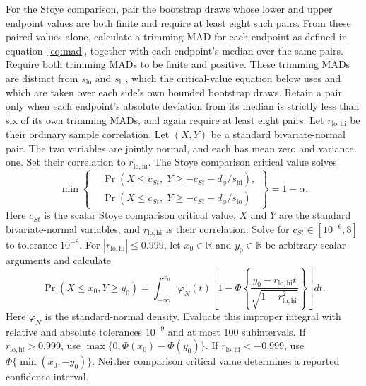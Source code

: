 \documentclass[11pt]{article}
\begin{document}
For the Stoye comparison, pair the bootstrap draws whose lower and upper endpoint values are both
finite and require at least eight such pairs. From these paired values alone, calculate a trimming
MAD for each endpoint as defined in equation~\eqref{eq:mad}, together with each endpoint's median
over the same pairs. Require both trimming MADs to be finite and positive. These trimming MADs are
distinct from \(s_{\mathrm{lo}}\) and \(s_{\mathrm{hi}}\), which the critical-value equation below
uses and which are taken over each side's own bounded bootstrap draws. Retain a pair only when each
endpoint's absolute deviation from its median is strictly less than six of its own trimming MADs,
and again require at least eight pairs. Let
\(r_{\mathrm{lo},\mathrm{hi}}\) be their ordinary sample correlation. Let
\((X,Y)\) be a standard bivariate-normal pair. The two variables are jointly normal, and each has mean
zero and variance one. Set their correlation to \(r_{\mathrm{lo},\mathrm{hi}}\). The Stoye comparison
critical value solves
\begin{equation*}
 \min\left\{
 \begin{aligned}
  &\Pr(X\le c_{St},\;Y\ge-c_{St}-d_\phi/s_{\mathrm{hi}}),\\
  &\Pr(X\le c_{St},\;Y\ge-c_{St}-d_\phi/s_{\mathrm{lo}})
 \end{aligned}
 \right\}=1-\alpha.
\end{equation*}
Here \(c_{St}\) is the scalar Stoye comparison critical value, \(X\) and \(Y\) are the standard
bivariate-normal variables, and \(r_{\mathrm{lo},\mathrm{hi}}\) is their correlation. Solve for
\(c_{St}\in[10^{-6},8]\) to tolerance \(10^{-8}\). For \(|r_{\mathrm{lo},\mathrm{hi}}|\le0.999\),
let \(x_0\in\mathbb R\) and \(y_0\in\mathbb R\) be arbitrary scalar arguments and calculate
\begin{equation*}
 \Pr(X\le x_0,Y\ge y_0)=
 \int_{-\infty}^{x_0}\varphi_N(t)
 \left[1-\Phi\left\{\frac{y_0-r_{\mathrm{lo},\mathrm{hi}}t}
 {\sqrt{1-r_{\mathrm{lo},\mathrm{hi}}^2}}\right\}\right]dt.
\end{equation*}
Here \(\varphi_N\) is the standard-normal density. Evaluate this improper integral with relative and
absolute tolerances \(10^{-9}\) and at most 100 subintervals. If
\(r_{\mathrm{lo},\mathrm{hi}}>0.999\), use
\(\max\{0,\Phi(x_0)-\Phi(y_0)\}\). If \(r_{\mathrm{lo},\mathrm{hi}}<-0.999\), use
\(\Phi\{\min(x_0,-y_0)\}\). Neither comparison critical value
determines a reported confidence interval.
\end{document}
